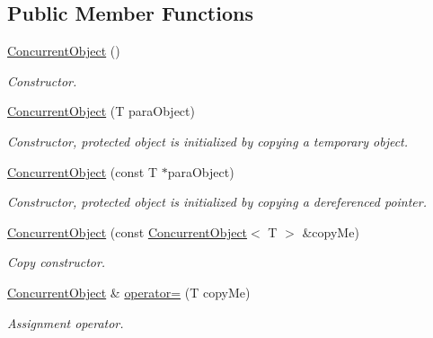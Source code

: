 \subsection*{Public Member Functions}
\begin{DoxyCompactItemize}
\item 
\hypertarget{class_concurrent_object_a0844cee0168d4803e20ab2ccebb7c4b2}{
\hyperlink{class_concurrent_object_a0844cee0168d4803e20ab2ccebb7c4b2}{ConcurrentObject} ()}
\label{class_concurrent_object_a0844cee0168d4803e20ab2ccebb7c4b2}

\begin{DoxyCompactList}\small\item\em Constructor. \item\end{DoxyCompactList}\item 
\hyperlink{class_concurrent_object_ade6d44385e7617576495c2eb6086b55e}{ConcurrentObject} (T paraObject)
\begin{DoxyCompactList}\small\item\em Constructor, protected object is initialized by copying a temporary object. \item\end{DoxyCompactList}\item 
\hyperlink{class_concurrent_object_a475bcece2dc474e030fb06fef911d49e}{ConcurrentObject} (const T $\ast$paraObject)
\begin{DoxyCompactList}\small\item\em Constructor, protected object is initialized by copying a dereferenced pointer. \item\end{DoxyCompactList}\item 
\hyperlink{class_concurrent_object_a115032e2d183d4de597e5255a7b487ad}{ConcurrentObject} (const \hyperlink{class_concurrent_object}{ConcurrentObject}$<$ T $>$ \&copyMe)
\begin{DoxyCompactList}\small\item\em Copy constructor. \item\end{DoxyCompactList}\item 
\hyperlink{class_concurrent_object}{ConcurrentObject} \& \hyperlink{class_concurrent_object_a0fbeab9f9c0f547d9da63ad1fef1b38e}{operator=} (T copyMe)
\begin{DoxyCompactList}\small\item\em Assignment operator. \item\end{DoxyCompactList}\item 

\end{DoxyCompactItemize}
